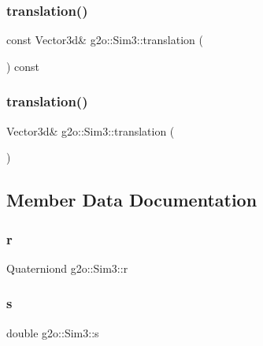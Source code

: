 \subsubsection{\texorpdfstring{translation()}{translation()}\hspace{0.1cm}{\footnotesize\ttfamily [1/2]}}
{\footnotesize\ttfamily const Vector3d\& g2o\+::\+Sim3\+::translation (\begin{DoxyParamCaption}{ }\end{DoxyParamCaption}) const\hspace{0.3cm}{\ttfamily [inline]}}

\mbox{\label{structg2o_1_1_sim3_a1429af2d97c44cd364d748ef07998593}} 
\subsubsection{\texorpdfstring{translation()}{translation()}\hspace{0.1cm}{\footnotesize\ttfamily [2/2]}}
{\footnotesize\ttfamily Vector3d\& g2o\+::\+Sim3\+::translation (\begin{DoxyParamCaption}{ }\end{DoxyParamCaption})\hspace{0.3cm}{\ttfamily [inline]}}



\subsection{Member Data Documentation}
\mbox{\label{structg2o_1_1_sim3_a55dbe5c6ffe22526f20e05f0c23aa832}} 
\subsubsection{\texorpdfstring{r}{r}}
{\footnotesize\ttfamily Quaterniond g2o\+::\+Sim3\+::r\hspace{0.3cm}{\ttfamily [protected]}}

\mbox{\label{structg2o_1_1_sim3_a2cad7c49340494d4bdd28a497e4cb486}} 
\subsubsection{\texorpdfstring{s}{s}}
{\footnotesize\ttfamily double g2o\+::\+Sim3\+::s\hspace{0.3cm}{\ttfamily [protected]}}

